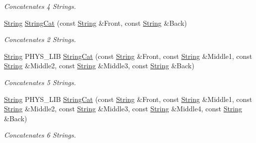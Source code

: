 \begin{DoxyCompactItemize}
\begin{DoxyCompactList}\small\item\em Concatenates 4 Strings. \item\end{DoxyCompactList}\item 
\hyperlink{namespacephys_aa03900411993de7fbfec4789bc1d392e}{String} \hyperlink{namespacephys_ae057253f75738c79bc5fdb5f1c5410de}{StringCat} (const \hyperlink{namespacephys_aa03900411993de7fbfec4789bc1d392e}{String} \&Front, const \hyperlink{namespacephys_aa03900411993de7fbfec4789bc1d392e}{String} \&Back)
\begin{DoxyCompactList}\small\item\em Concatenates 2 Strings. \item\end{DoxyCompactList}\item 
\hyperlink{namespacephys_aa03900411993de7fbfec4789bc1d392e}{String} PHYS\_\-LIB \hyperlink{namespacephys_ae78c97cc3fea1bc4cb28ff77e98f4e71}{StringCat} (const \hyperlink{namespacephys_aa03900411993de7fbfec4789bc1d392e}{String} \&Front, const \hyperlink{namespacephys_aa03900411993de7fbfec4789bc1d392e}{String} \&Middle1, const \hyperlink{namespacephys_aa03900411993de7fbfec4789bc1d392e}{String} \&Middle2, const \hyperlink{namespacephys_aa03900411993de7fbfec4789bc1d392e}{String} \&Middle3, const \hyperlink{namespacephys_aa03900411993de7fbfec4789bc1d392e}{String} \&Back)
\begin{DoxyCompactList}\small\item\em Concatenates 5 Strings. \item\end{DoxyCompactList}\item 
\hyperlink{namespacephys_aa03900411993de7fbfec4789bc1d392e}{String} PHYS\_\-LIB \hyperlink{namespacephys_abf6b30d4f424f33ee4c74d1cb6eca109}{StringCat} (const \hyperlink{namespacephys_aa03900411993de7fbfec4789bc1d392e}{String} \&Front, const \hyperlink{namespacephys_aa03900411993de7fbfec4789bc1d392e}{String} \&Middle1, const \hyperlink{namespacephys_aa03900411993de7fbfec4789bc1d392e}{String} \&Middle2, const \hyperlink{namespacephys_aa03900411993de7fbfec4789bc1d392e}{String} \&Middle3, const \hyperlink{namespacephys_aa03900411993de7fbfec4789bc1d392e}{String} \&Middle4, const \hyperlink{namespacephys_aa03900411993de7fbfec4789bc1d392e}{String} \&Back)
\begin{DoxyCompactList}\small\item\em Concatenates 6 Strings. \item\end{DoxyCompactList}\item 

\end{DoxyCompactItemize}
